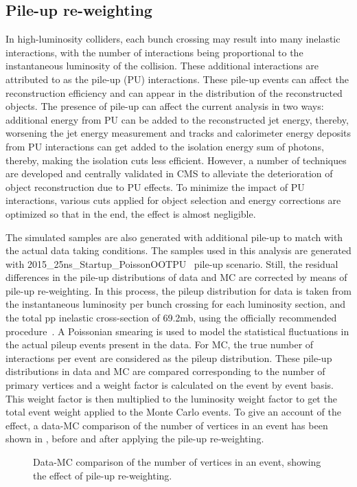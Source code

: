 \subsection{Pile-up re-weighting}
In high-luminosity colliders, each bunch crossing may result into many inelastic interactions, with the number of interactions being proportional to the
instantaneous luminosity of the collision. These additional interactions are attributed to as the pile-up (PU) interactions. These pile-up events can
affect the reconstruction efficiency and can appear in the \pt distribution of the reconstructed objects. 
The presence of pile-up can affect the current analysis in two ways: additional energy from PU can be added to the reconstructed jet energy, thereby, worsening the jet
energy measurement and tracks and calorimeter energy deposits from PU interactions can get added to the isolation energy sum of photons, thereby, making the
isolation cuts less efficient. However, a number of techniques are developed and centrally validated in CMS to alleviate the deterioration of object
reconstruction due to PU effects. To minimize the impact of PU interactions, various cuts applied for object selection and energy corrections are optimized so that
in the end, the effect is almost negligible.

The simulated samples are also generated with additional pile-up to match with the actual data taking conditions. The samples used in this analysis are generated
with 2015\_25ns\_Startup\_PoissonOOTPU~\cite{Web:PileupScenario} pile-up scenario. Still, the residual differences in the pile-up distributions of data and MC are 
corrected by means of pile-up re-weighting. In this process, the pileup distribution for data is taken from the instantaneous luminosity per bunch
crossing for each luminosity section, and the total pp inelastic cross-section of 69.2\unit{mb}, using the officially recommended procedure~\cite{Web:PileupScenario}.
A Poissonian smearing is used to model the statistical fluctuations in the actual pileup events present in the data. For MC, the true number of
interactions per event are considered as the pileup distribution. These pile-up distributions in data and MC are compared corresponding to the number
of primary vertices and a weight factor is calculated on the event by event basis. This weight factor is then multiplied to the luminosity weight factor to
get the total event weight applied to the Monte Carlo events. To give an account of the effect, a data-MC comparison of
the number of vertices in an event has been shown in \fig{\ref{fig:PUrewt}}, before
and after applying the pile-up re-weighting.
\begin{figure}[h!]
\centering
 \caption{Data-MC comparison of the number of vertices in an event, showing the effect of pile-up re-weighting.}
\label{fig:PUrewt}
\end{figure}
\vspace{-0.3in}
